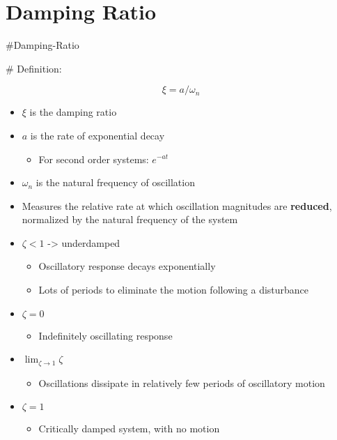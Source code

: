 \documentclass[10pt]{report}
\begin{document}
\chapter{Damping Ratio}\label{ch:Damping Ratio}

\#Damping-Ratio 

\# Definition: 

$$\xi = a/\omega_{n}$$

\begin{itemize}
\item $\xi$ is the damping ratio
\item $a$ is the rate of exponential decay

\begin{itemize}
\item For second order systems: $e^{-at}$ 

\end{itemize}
\item $\omega_{n}$ is the natural frequency of oscillation 

\item Measures the relative rate at which oscillation magnitudes are \textbf{reduced}, normalized by the natural frequency of the system

\item $\zeta < 1$ ->  underdamped

\begin{itemize}
\item Oscillatory response decays exponentially 

\item Lots of periods to eliminate the motion following a disturbance

\end{itemize}
\item $\zeta=0$ 

\begin{itemize}
\item Indefinitely oscillating response

\end{itemize}
\item $\lim_{\zeta \rightarrow 1} \zeta$

\begin{itemize}
\item Oscillations dissipate in relatively few periods of oscillatory motion

\end{itemize}
\item $\zeta=1$ 

\begin{itemize}
\item Critically damped system, with no motion

\end{itemize}
\end{itemize}
\end{document}
